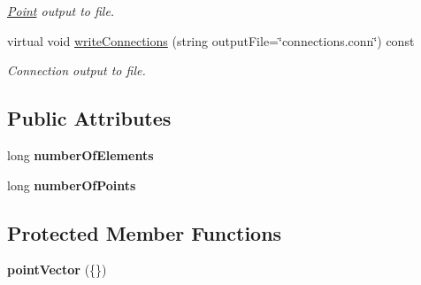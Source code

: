 \begin{DoxyCompactItemize}
\begin{DoxyCompactList}\small\item\em \hyperlink{class_point}{\-Point} output to file. \end{DoxyCompactList}\item 
\hypertarget{class_mesh_adb3c64b4f1420c5ed0b6a74c6d9b116b}{virtual void \hyperlink{class_mesh_adb3c64b4f1420c5ed0b6a74c6d9b116b}{write\-Connections} (string output\-File=\char`\"{}connections.\-conn\char`\"{}) const }\label{class_mesh_adb3c64b4f1420c5ed0b6a74c6d9b116b}

\begin{DoxyCompactList}\small\item\em \-Connection output to file. \end{DoxyCompactList}\end{DoxyCompactItemize}
\subsection*{\-Public \-Attributes}
\begin{DoxyCompactItemize}
\item 
\hypertarget{class_mesh_af7c23d5f0561acb3fb7fae234e5f2f32}{long {\bfseries number\-Of\-Elements}}\label{class_mesh_af7c23d5f0561acb3fb7fae234e5f2f32}

\item 
\hypertarget{class_mesh_a6b2ec9290bb2a198ea28a2577a43e271}{long {\bfseries number\-Of\-Points}}\label{class_mesh_a6b2ec9290bb2a198ea28a2577a43e271}

\end{DoxyCompactItemize}
\subsection*{\-Protected \-Member \-Functions}
\begin{DoxyCompactItemize}
\item 
\hypertarget{class_mesh_ad452633f442cc10c9f9973fa82d63e58}{{\bfseries point\-Vector} (\{\})}\label{class_mesh_ad452633f442cc10c9f9973fa82d63e58}

\end{DoxyCompactItemize}
